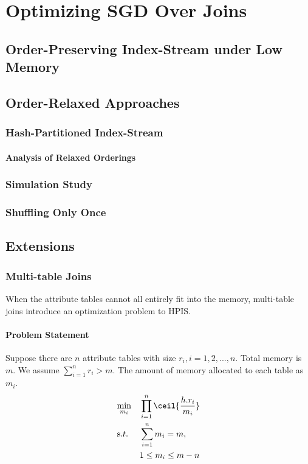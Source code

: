 \documentclass{vldb}
\begin{document}
\section{Optimizing SGD Over Joins}


\subsection{Order-Preserving Index-Stream under Low Memory}



\subsection{Order-Relaxed Approaches}

\subsubsection{Hash-Partitioned Index-Stream}

\paragraph*{Analysis of Relaxed Orderings}

\subsubsection{Simulation Study}

\subsubsection{Shuffling Only Once}


\subsection{Extensions}

\subsubsection{Multi-table Joins}
When the attribute tables cannot all entirely fit into the memory, multi-table joins introduce an optimization problem to HPIS.
\vspace{-1mm}
\paragraph*{Problem Statement}

Suppose there are $n$ attribute tables with size $r_i, i=1,2,...,n$. Total memory is $m$.
We assume $\sum_{i=1}^n r_i > m$. The amount of memory allocated to each table as $m_i$.
\begin{equation*}
\begin{aligned}
& \underset{m_i}{\text{min}}
& & \prod\limits_{i=1}^n \ceil{\frac{h.r_i}{m_i}} \\
& \text s.t.
& & \sum_{i=1}^n m_i = m, \\
&&& 1\le m_i\le m-n 
\end{aligned}
\end{equation*}
\end{document}
